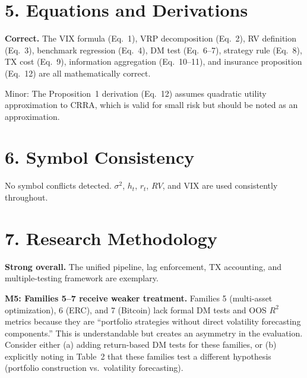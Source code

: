 \documentclass[12pt,a4paper]{article}
\begin{document}
\section*{5. Equations and Derivations}

\textcolor{okgreen}{\textbf{Correct.}} The VIX formula (Eq.~1), VRP decomposition (Eq.~2), RV definition (Eq.~3), benchmark regression (Eq.~4), DM test (Eq.~6--7), strategy rule (Eq.~8), TX cost (Eq.~9), information aggregation (Eq.~10--11), and insurance proposition (Eq.~12) are all mathematically correct.

Minor: The Proposition~1 derivation (Eq.~12) assumes quadratic utility approximation to CRRA, which is valid for small risk but should be noted as an approximation.

\section*{6. Symbol Consistency}

No symbol conflicts detected. $\sigma^2$, $h_t$, $r_t$, $RV$, and $\text{VIX}$ are used consistently throughout.

\section*{7. Research Methodology}

\textcolor{okgreen}{\textbf{Strong overall.}} The unified pipeline, lag enforcement, TX accounting, and multiple-testing framework are exemplary.

\textcolor{warncolor}{\textbf{M5: Families 5--7 receive weaker treatment.}}
Families 5 (multi-asset optimization), 6 (ERC), and 7 (Bitcoin) lack formal DM tests and OOS $R^2$ metrics because they are ``portfolio strategies without direct volatility forecasting components.'' This is understandable but creates an asymmetry in the evaluation. Consider either (a) adding return-based DM tests for these families, or (b) explicitly noting in Table~2 that these families test a different hypothesis (portfolio construction vs.\ volatility forecasting).
\end{document}
